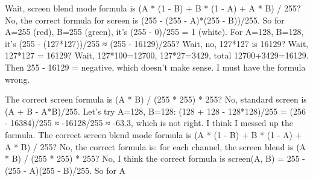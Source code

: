 Wait, screen blend mode formula is (A * (1 - B) + B * (1 - A) + A * B) / 255? No, the correct formula for screen is (255 - (255 - A)*(255 - B))/255. So for A=255 (red), B=255 (green), it's (255 - 0)/255 = 1 (white). For A=128, B=128, it's (255 - (127*127))/255 ≈ (255 - 16129)/255? Wait, no, 127*127 is 16129? Wait, 127*127 = 16129? Wait, 127*100=12700, 127*27=3429, total 12700+3429=16129. Then 255 - 16129 = negative, which doesn't make sense. I must have the formula wrong. 

The correct screen formula is (A * B) / (255 * 255) * 255? No, standard screen is (A + B - A*B)/255. Let's try A=128, B=128: (128 + 128 - 128*128)/255 = (256 - 16384)/255 ≈ -16128/255 ≈ -63.3, which is not right. I think I messed up the formula. The correct screen blend mode formula is (A * (1 - B) + B * (1 - A) + A * B) / 255? No, the correct formula is: for each channel, the screen blend is (A * B) / (255 * 255) * 255? No, I think the correct formula is screen(A, B) = 255 - (255 - A)(255 - B)/255. So for A